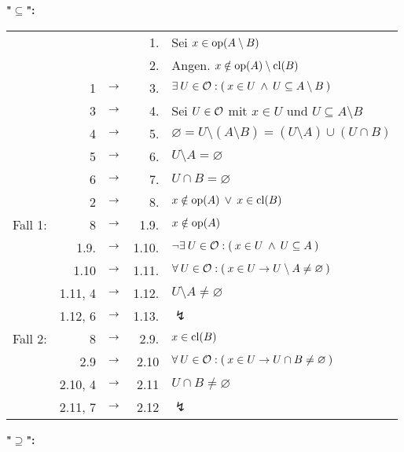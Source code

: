     \noindent
    \textbf{"$\boldsymbol{\subseteq}$":}
        \begin{longtable}{r r c r l}
            & & & 1. & Sei $x \in \text{op}(A \setminus B) $ \\
            & & & 2. & Angen. $x \notin \text{op}(A) \setminus \text{cl}(B)$ \\
            & 1 & $\rightarrow$ & 3. & $\exists\: U \in \mathcal{O} : (\: x \in U \:\land\: U \subseteq A \setminus B \:)$ \\
            & 3 & $\rightarrow$ & 4. & Sei $U \in \mathcal{O}$ mit $x \in U$ und $U \subseteq A \setminus B$ \\
            & 4 & $\rightarrow$ & 5. & $\varnothing = U \setminus (A \setminus B) = (U \setminus A) \cup (U \cap B)$ \\
            & 5 & $\rightarrow$ & 6. & $U \setminus A = \varnothing$ \\
            & 6 & $\rightarrow$ & 7. & $U \cap B = \varnothing$ \\
            & 2 & $\rightarrow$ & 8. & $x \notin \text{op}(A) \:\lor\: x \in \text{cl}(B)$ \\
            \hline
            Fall 1: & 8 & $\rightarrow$ & 1.9. & $x \notin \text{op}(A)$ \\
            & 1.9. & $\rightarrow$ & 1.10. & $\neg \exists\: U \in \mathcal{O} : (\: x \in U \:\land\: U \subseteq A \:)$ \\
            & 1.10 & $\rightarrow$ & 1.11. & $\forall\: U \in \mathcal{O} : (\: x \in U \to U \setminus A \neq \varnothing \:)$ \\
            & 1.11, 4 & $\rightarrow$ & 1.12. & $U \setminus A \neq \varnothing$ \\
            & 1.12, 6 & $\rightarrow$ & 1.13. & $\lightning$ \\
            \hline
            Fall 2: 
            & 8 & $\rightarrow$ & 2.9. & $x \in \text{cl}(B)$ \\
            & 2.9 & $\rightarrow$ & 2.10 & $\forall\: U \in \mathcal{O} : (\: x \in U \to U \cap B \neq \varnothing \:)$ \\
            & 2.10, 4 & $\rightarrow$ & 2.11 & $U \cap B \neq \varnothing$ \\
            & 2.11, 7 & $\rightarrow$ & 2.12 & $\lightning$ \\
        \end{longtable}

    \noindent
    \textbf{"$\boldsymbol{\supseteq}$":}

